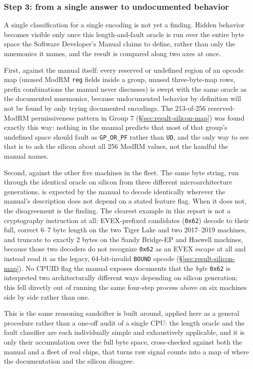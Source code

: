\documentclass[11pt]{article}
\newcommand{\code}[1]{\texttt{#1}}
\begin{document}
\subsubsection{Step 3: from a single answer to undocumented behavior}

A single classification for a single encoding is not yet a finding. Hidden
behavior becomes visible only once this length-and-fault oracle is run
over the entire byte space the Software Developer's Manual claims to
define, rather than only the mnemonics it names, and the result is
compared along two axes at once.

First, against the manual itself: every reserved or undefined region of
an opcode map (unused ModRM \code{reg} fields inside a group, unused
three-byte-map rows, prefix combinations the manual never discusses) is
swept with the same oracle as the documented mnemonics, because
undocumented behavior by definition will not be found by only trying
documented encodings. The 213-of-256 reserved-ModRM permissiveness
pattern in Group 7 (\S\ref{sec:result-silicon-map}) was found exactly
this way: nothing in the manual predicts that most of that group's
undefined space should fault as \code{GP\_OR\_PF} rather than
\code{UD}, and the only way to see that is to ask the silicon about all
256 ModRM values, not the handful the manual names.

Second, against the other five machines in the fleet. The same byte
string, run through the identical oracle on silicon from three
different microarchitecture generations, is expected by the manual to
decode identically wherever the manual's description does not depend on
a stated feature flag. When it does not, the disagreement is the
finding. The clearest example in this report is not a cryptography
instruction at all: EVEX-prefixed candidates (\code{0x62}) decode to
their full, correct 6--7 byte length on the two Tiger Lake and two
2017--2019 machines, and truncate to exactly 2 bytes on the Sandy
Bridge-EP and Haswell machines, because those two decoders do not
recognize \code{0x62} as an EVEX escape at all and instead read it as
the legacy, 64-bit-invalid \code{BOUND} opcode (\S\ref{sec:result-silicon-map}).
No CPUID flag the manual exposes documents that the \emph{byte}
\code{0x62} is interpreted two architecturally different ways depending
on silicon generation; this fell directly out of running the same
four-step process above on six machines side by side rather than one.

This is the same reasoning sandsifter is built around, applied here as
a general procedure rather than a one-off audit of a single CPU: the
length oracle and the fault classifier are each individually simple and
exhaustively applicable, and it is only their accumulation over the
full byte space, cross-checked against both the manual and a fleet of
real chips, that turns raw signal counts into a map of where the
documentation and the silicon disagree.
\end{document}
